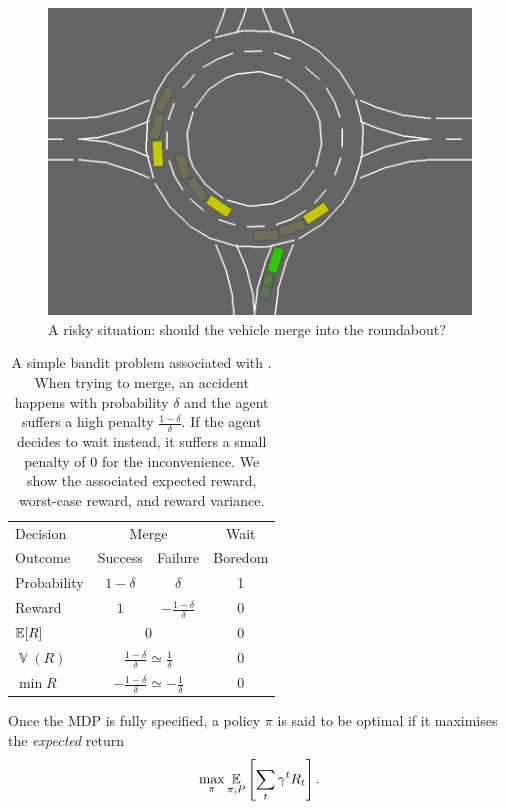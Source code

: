 \begin{figure}[ht]
	\centering
	\includegraphics[trim={0 0.5cm 0 0}, clip, width=0.5\linewidth]{img/roundabout3-small}
	\caption{A risky situation: should the vehicle merge into the roundabout?}
	\label{fig:risky-problem}
\end{figure}
\begin{table}[ht]
	\centering
	\begin{tabular}{lccc}
		\toprule
		Decision & \multicolumn{2}{c}{Merge} & Wait \\
		\cmidrule(lr){2-3}
		\cmidrule(lr){4-4}
		Outcome & Success & Failure & Boredom \\
		Probability & $1-\delta$ & $\delta$ & 1 \\
		Reward & $1$ & $-\frac{1-\delta}{\delta}$ & 0 \\
		\midrule
		$\operatorname*{\mathbb{E}}[R]$ & \multicolumn{2}{c}{$0$} & $0$ \\
		$\mathop{\mathbb{V}}(R)$ & \multicolumn{2}{c}{$\frac{1-\delta}{\delta} \simeq \frac{1}{\delta}$} & $0$ \\
		$\min R$ & \multicolumn{2}{c}{$-\frac{1-\delta}{\delta} \simeq -\frac{1}{\delta}$} & $0$ \\
		\bottomrule	
	\end{tabular}
	\caption{A simple bandit problem associated with . When trying to merge, an accident happens with probability $\delta$ and the agent suffers a high penalty $\frac{1-\delta}{\delta}$. If the agent decides to wait instead, it suffers a small penalty of $0$ for the inconvenience. We show the associated expected reward, worst-case reward, and reward variance.}
	\label{tab:risky-problem}
\end{table}

Once the \acl*{MDP} is fully specified, a policy $\pi$ is said to be optimal if it maximises the \emph{expected} return
\begin{equation*}
\max_\pi \operatorname*{\mathbb{E}}_{\pi, P} \left[\sum_t \gamma^t R_t \right].
\end{equation*}

